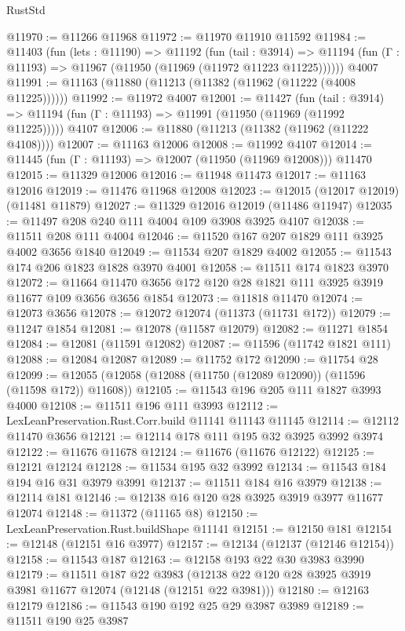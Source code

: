 \begin{lexlean}{RustStd}
\begin{coremodule}
@11970 := @11266 @11968
@11972 := @11970 @11910 @11592
@11984 := @11403
    (fun (lets : @11190) =>
    @11192
      (fun (tail : @3914) =>
      @11194 (fun (Γ : @11193) => @11967 (@11950 (@11969 (@11972 @11223 @11225))))))
    @4007
@11991 := @11163 (@11880 (@11213 (@11382 (@11962 (@11222 (@4008 @11225))))))
@11992 := @11972 @4007
@12001 := @11427
    (fun (tail : @3914) => @11194 (fun (Γ : @11193) => @11991 (@11950 (@11969 (@11992 @11225)))))
    @4107
@12006 := @11880 (@11213 (@11382 (@11962 (@11222 @4108))))
@12007 := @11163 @12006
@12008 := @11992 @4107
@12014 := @11445 (fun (Γ : @11193) => @12007 (@11950 (@11969 @12008))) @11470
@12015 := @11329 @12006
@12016 := @11948 @11473
@12017 := @11163 @12016
@12019 := @11476 @11968 @12008
@12023 := @12015 (@12017 @12019) (@11481 @11879)
@12027 := @11329 @12016 @12019 (@11486 @11947)
@12035 := @11497 @208 @240 @111 @4004 @109 @3908 @3925 @4107
@12038 := @11511 @208 @111 @4004
@12046 := @11520 @167 @207 @1829 @111 @3925 @4002 @3656 @1840
@12049 := @11534 @207 @1829 @4002
@12055 := @11543 @174 @206 @1823 @1828 @3970 @4001
@12058 := @11511 @174 @1823 @3970
@12072 := @11664 @11470 @3656 @172 @120 @28 @1821 @111 @3925 @3919 @11677 @109 @3656 @3656 @1854
@12073 := @11818 @11470
@12074 := @12073 @3656
@12078 := @12072 @12074 (@11373 (@11731 @172))
@12079 := @11247 @1854
@12081 := @12078 (@11587 @12079)
@12082 := @11271 @1854
@12084 := @12081 (@11591 @12082)
@12087 := @11596 (@11742 @1821 @111)
@12088 := @12084 @12087
@12089 := @11752 @172
@12090 := @11754 @28
@12099 := @12055 (@12058 (@12088 (@11750 (@12089 @12090)) (@11596 (@11598 @172)) @11608))
@12105 := @11543 @196 @205 @111 @1827 @3993 @4000
@12108 := @11511 @196 @111 @3993
@12112 := LexLeanPreservation.Rust.Corr.build @11141 @11143 @11145
@12114 := @12112 @11470 @3656
@12121 := @12114 @178 @111 @195 @32 @3925 @3992 @3974
@12122 := @11676 @11678
@12124 := @11676 (@11676 @12122)
@12125 := @12121 @12124
@12128 := @11534 @195 @32 @3992
@12134 := @11543 @184 @194 @16 @31 @3979 @3991
@12137 := @11511 @184 @16 @3979
@12138 := @12114 @181
@12146 := @12138 @16 @120 @28 @3925 @3919 @3977 @11677 @12074
@12148 := @11372 (@11165 @8)
@12150 := LexLeanPreservation.Rust.buildShape @11141
@12151 := @12150 @181
@12154 := @12148 (@12151 @16 @3977)
@12157 := @12134 (@12137 (@12146 @12154))
@12158 := @11543 @187
@12163 := @12158 @193 @22 @30 @3983 @3990
@12179 := @11511
    @187
    @22
    @3983
    (@12138 @22 @120 @28 @3925 @3919 @3981 @11677 @12074 (@12148 (@12151 @22 @3981)))
@12180 := @12163 @12179
@12186 := @11543 @190 @192 @25 @29 @3987 @3989
@12189 := @11511 @190 @25 @3987

\end{coremodule}
\end{lexlean}

